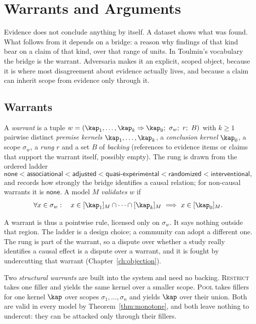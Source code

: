 \chapter{Warrants and Arguments}\label{ch:warrant}

Evidence does not conclude anything by itself. A dataset shows what was found. What follows from it depends on a bridge: a reason why findings of that kind bear on a claim of that kind, over that range of units. In Toulmin's vocabulary the bridge is the warrant. Adversaria makes it an explicit, scoped object, because it is where most disagreement about evidence actually lives, and because a claim can inherit scope from evidence only through it.

\section{Warrants}

\begin{definition}[Warrant]\label{def:warrant}
A \emph{warrant} is a tuple $w=(\kap_1,\dots,\kap_k\Rightarrow\kap_0;\ \sigma_w;\ r;\ B)$ with $k\ge1$ pairwise distinct \emph{premise kernels} $\kap_1,\dots,\kap_k$, a \emph{conclusion kernel} $\kap_0$, a scope $\sigma_w$, a \emph{rung} $r$ and a set $B$ of \emph{backing} (references to evidence items or claims that support the warrant itself, possibly empty). The rung is drawn from the ordered ladder
\[
\mathsf{none}<\mathsf{associational}<\mathsf{adjusted}<\mathsf{quasi\text{-}experimental}<\mathsf{randomized}<\mathsf{interventional},
\]
and records how strongly the bridge identifies a causal relation; for non-causal warrants it is $\mathsf{none}$. A model $M$ \emph{validates} $w$ if
\[
\forall x\in\sigma_w:\quad x\in[\kap_1]_M\cap\dots\cap[\kap_k]_M\ \Longrightarrow\ x\in[\kap_0]_M .
\]
\end{definition}

A warrant is thus a pointwise rule, licensed only on $\sigma_w$. It says nothing outside that region. The ladder is a design choice; a community can adopt a different one. The rung is part of the warrant, so a dispute over whether a study really identifies a causal effect is a dispute over a warrant, and it is fought by undercutting that warrant (Chapter~\ref{ch:objection}).

Two \emph{structural warrants} are built into the system and need no backing. \textsc{Restrict} takes one filler and yields the same kernel over a smaller scope. \textsc{Pool} takes fillers for one kernel $\kap$ over scopes $\sigma_1,\dots,\sigma_n$ and yields $\kap$ over their union. Both are valid in every model by Theorem~\ref{thm:monotone}, and both leave nothing to undercut: they can be attacked only through their fillers.

